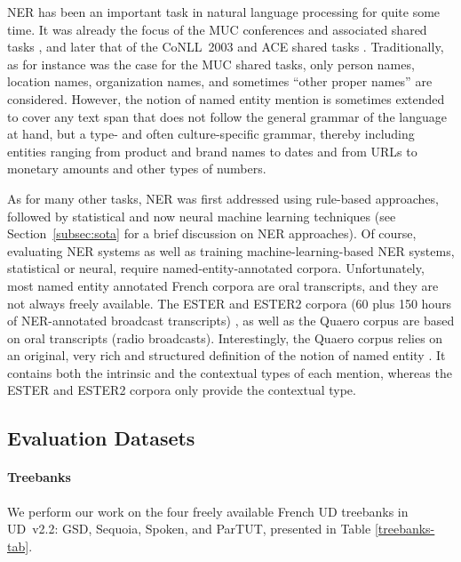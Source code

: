 NER has been an important task in natural language processing for quite some time. It was already the focus of the MUC conferences and associated shared tasks
\citep{marsh-perzanowski-1998-muc}, and later that of the CoNLL~2003 and ACE shared tasks \citep{tjong-kim-sang-de-meulder-2003-introduction,doddington-etal-2004-automatic}. Traditionally, as for instance was the case for the MUC shared tasks, only person names, location names, organization names, and sometimes ``other proper names'' are considered. However, the notion of named entity mention is sometimes extended to cover any text span that does not follow the general grammar of the language at hand, but a type- and often culture-specific grammar, thereby including entities ranging from product and brand names to dates and from URLs to monetary amounts and other types of numbers.

As for many other tasks, NER was first addressed using rule-based approaches, followed by statistical and now neural machine learning techniques (see Section~\ref{subsec:sota} for a brief discussion on NER approaches). Of course, evaluating NER systems as well as training machine-learning-based NER systems, statistical or neural, require named-entity-annotated corpora. Unfortunately, most named entity annotated French corpora are oral transcripts, and they are not always freely available. The ESTER and ESTER2 corpora (60 plus 150 hours of NER-annotated broadcast transcripts) \citep{galliano-etal-2005-the,galliano-etal-2009-the}, as well as the Quaero \citep{grouin-etal-2011-proposal} corpus are based on oral transcripts (radio broadcasts). Interestingly, the Quaero corpus relies on an original, very rich and structured  definition of the notion of named entity \citep{rosset-etal-2011-entites}. It contains both the intrinsic and the contextual types of each mention, whereas the ESTER and ESTER2 corpora only provide the contextual type.

\subsection{Evaluation Datasets}

\paragraph{Treebanks}
We perform our work on the four freely available French UD treebanks in UD~v2.2: GSD, Sequoia, Spoken, and ParTUT, presented in Table \ref{treebanks-tab}.

